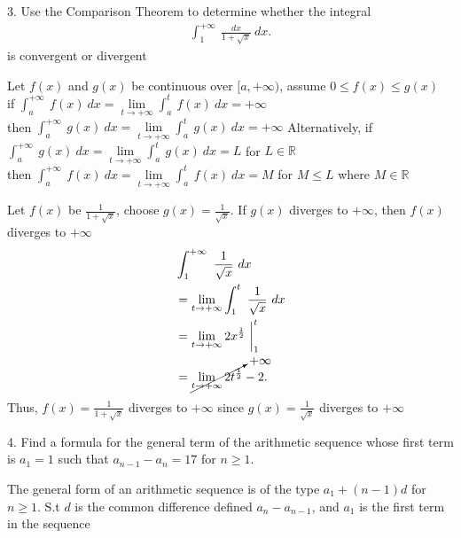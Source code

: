 \documentclass{report}
\begin{document}
    \bigbreak \noindent 
    \begin{mdframed}
        3. Use the Comparison Theorem to determine whether the integral
        \begin{align*}
            \int_{1}^{+\infty}\ \frac{dx}{1+\sqrt{x}}\ dx
        .\end{align*}
        is convergent or divergent
    \end{mdframed}
    \bigbreak \noindent 
    \begin{remark}
        Let $f(x)$ and $g(x)$ be continuous over $[a,+\infty)$, assume $0 \leq f(x) \leq g(x)$ \\
        if $\int_{a}^{+\infty}\ f(x)\ dx = \lim\limits_{t \to +\infty}{\int_{a}^{t}\ f(x)\ dx} = +\infty$ \\
        then $\int_{a}^{+\infty}\ g(x)\ dx  = \lim\limits_{t \to +\infty}{\int_{a}^{t}\ g(x)\ dx} = +\infty$
        \bigbreak \noindent 
        Alternatively,
        \smallbreak \noindent
        if $\int_{a}^{+\infty}\ g(x)\ dx = \lim\limits_{t \to +\infty}{\int_{a}^{t}\ g(x)\ dx} = L$ for $L \in \mathbb{R}$ \\
        then $\int_{a}^{+\infty}\ f(x)\ dx  = \lim\limits_{t \to +\infty}{\int_{a}^{t}\ f(x)\ dx} = M$ for $M \leq L $ where $M \in \mathbb{R}$
    \end{remark}
    \bigbreak \noindent 
    Let $f(x)$ be $\frac{1}{1+\sqrt{x}}$, choose $g(x) = \frac{1}{\sqrt{x}}$. If $g(x)$ diverges to $+\infty$, then $f(x)$ diverges to $+\infty$
    \begin{align*}
        &\int_{1}^{+\infty}\ \frac{1}{\sqrt{x}}\ dx      \\
        &=\lim\limits_{t \to +\infty}{\int_{1}^{t}\ \frac{1}{\sqrt{x}}\ dx} \\
        &=\lim\limits_{t \to +\infty}{2x^{\frac{1}{2}}}\ \bigg|_1^{t} \\
        &=\cancelto{+\infty}{\lim\limits_{t \to +\infty}{2t^{\frac{1}{2}}}} - 2
    .\end{align*}
    \bigbreak \noindent 
    Thus, $f(x) = \frac{1}{1+\sqrt{x}}$ diverges to $+\infty$ since $g(x)  = \frac{1}{\sqrt{x}}$ diverges to $+\infty$ 

    \pagebreak \bigbreak \noindent 
    \begin{mdframed}
        4. Find a formula for the general term of the arithmetic sequence whose first term is \( a_1 = 1 \) such that \( a_{n-1} - a_n = 17 \) for \( n \geq 1 \).
    \end{mdframed}
    \bigbreak \noindent 
    \begin{remark}
       The general form of an arithmetic sequence is of the type $a_{1}+(n-1)d$ for $n \geq 1$. S.t $d$ is the common difference defined $a_{n}- a_{n-1}$, and $a_{1}$ is the first term in the sequence
    \end{remark}
\end{document}
